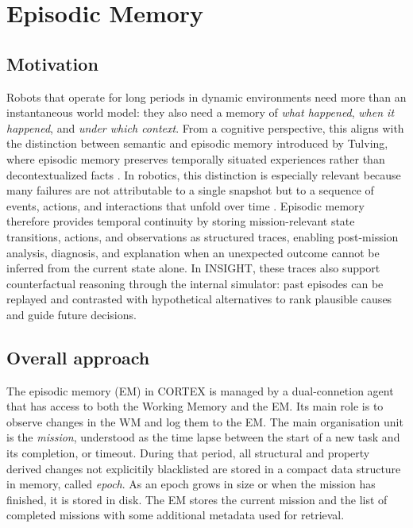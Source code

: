 \documentclass[a4paper, twoside]{article}
\begin{document}
\section{Episodic Memory}

\subsection{Motivation}

Robots that operate for long periods in dynamic environments need more than an instantaneous world model: they also need a memory of \emph{what happened}, \emph{when it happened}, and \emph{under which context}. From a cognitive perspective, this aligns with the distinction between semantic and episodic memory introduced by Tulving, where episodic memory preserves temporally situated experiences rather than decontextualized facts \cite{tulving1972episodic,tulving1983elements}. In robotics, this distinction is especially relevant because many failures are not attributable to a single snapshot but to a sequence of events, actions, and interactions that unfold over time \cite{pugach2016episodic,dautenhahn1998episodic}. Episodic memory therefore provides temporal continuity by storing mission-relevant state transitions, actions, and observations as structured traces, enabling post-mission analysis, diagnosis, and explanation when an unexpected outcome cannot be inferred from the current state alone. In INSIGHT, these traces also support counterfactual reasoning through the internal simulator: past episodes can be replayed and contrasted with hypothetical alternatives to rank plausible causes and guide future decisions.

\subsection{Overall approach}
 The episodic memory (EM) in CORTEX is managed by a dual-connetion agent that has access to both the Working Memory and the EM. Its main role is to observe changes in the WM and log them to the EM. The main organisation unit is the \textit{mission}, understood as the time lapse between the start of a new task and its completion, or timeout. During that period, all structural and property derived changes not explicitily blacklisted are stored in a compact data structure in memory, called \textit{epoch}. As an epoch grows in size or when the mission has finished, it is stored in disk. The EM stores the current mission and the list of completed missions with some additional metadata used for retrieval.
\end{document}
